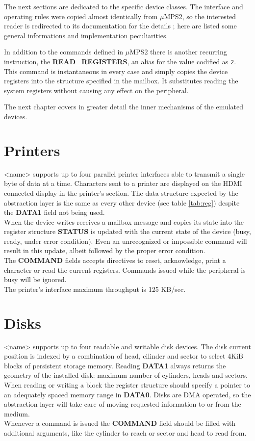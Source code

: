 \documentclass[12pt,a4paper,openright,twoside]{report}
\begin{document}
The next sections are dedicated to the specific device classes. The interface and
operating rules were copied almost identically from $\mu$MPS2, so the interested
reader is redirected to its documentation for the details \cite{pop}; here are listed
some general informations and implementation peculiarities.

In addition to the commands defined in $\mu$MPS2 there is another recurring instruction,
the \textbf{READ\_REGISTERS}, an alias for the value codified as {\tt 2}. This
command is instantaneous in every case and simply copies the device registers into
the structure specified in the mailbox. It substitutes reading the system registers
without causing any effect on the peripheral.

The next chapter covers in greater detail the inner mechanisms of the emulated 
devices.

\section{Printers}
<name> supports up to four parallel printer interfaces able to transmit a 
single byte of data at a time. Characters sent to a printer are displayed on 
the HDMI connected display in the printer's section.
The data structure expected by the abstraction layer is the same as every other
device (see table \ref{tab:reg}) despite the \textbf{DATA1} field not being used.\\
When the device writes receives a mailbox message and copies its state into the
register structure \textbf{STATUS} is updated with the current state of the device
(busy, ready, under error condition). Even an unrecognized or impossible command will
 result in this update, albeit followed by the proper error condition.\\
The \textbf{COMMAND} fields accepts directives to reset, acknowledge, print a
character or read the current registers. Commands issued while the peripheral
is busy will be ignored.\\
The printer's interface maximum throughput is 125 KB/sec.

\section{Disks}
<name> supports up to four readable and writable disk devices. The disk current
position is indexed by a combination of head, cilinder and sector to select
4KiB blocks of persistent storage memory.
Reading \textbf{DATA1} always returns the geometry of the installed disk: maximum
number of cylinders, heads and sectors.\\
When reading or writing a block the register structure should specify a pointer
to an adequately spaced memory range in \textbf{DATA0}. Disks are DMA operated, so the abstraction
layer will take care of moving requested information to or from the medium.\\
Whenever a command is issued the \textbf{COMMAND} field should be filled with
additional arguments, like the cylinder to reach or sector and head to read from.
\end{document}
